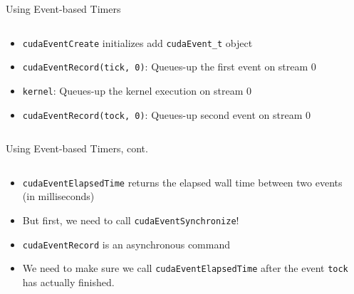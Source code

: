 \documentclass{beamer}
\begin{document}
    \begin{frame}{Using Event-based Timers}
        \begin{columns}
            \begin{column}{0.4\textwidth}
            {\footnotesize
            \begin{itemize}
                \item \texttt{cudaEventCreate} initializes add \texttt{cudaEvent\_t} object
                \item \texttt{cudaEventRecord(tick, 0)}:  Queues-up the first event on stream 0
                \item \texttt{kernel}: Queues-up the kernel execution on stream 0
                \item \texttt{cudaEventRecord(tock, 0)}: Queues-up second event on stream 0
            \end{itemize}
            }
            \end{column}
            \begin{column}{0.6\textwidth}
                \begin{block}{}
                    \inputminted{cuda}{src/gpu-timer.cu}
                \end{block}
            \end{column}
        \end{columns}
    \end{frame}

    \begin{frame}{Using Event-based Timers, cont.}
        \begin{columns}
            \begin{column}{0.4\textwidth}
            {\footnotesize
            \begin{itemize}
                \item \texttt{cudaEventElapsedTime} returns the elapsed wall time between two events (in milliseconds)
                \item But first, we need to call \texttt{cudaEventSynchronize}!
                \item \texttt{cudaEventRecord} is an asynchronous command
                \item We need to make sure we call \texttt{cudaEventElapsedTime} after the event \texttt{tock} has actually finished.
            \end{itemize}
            }
            \end{column}
            \begin{column}{0.6\textwidth}
                \begin{block}{}
                    \inputminted{cuda}{src/gpu-timer.cu}
                \end{block}
            \end{column}
        \end{columns}
    \end{frame}
\end{document}
